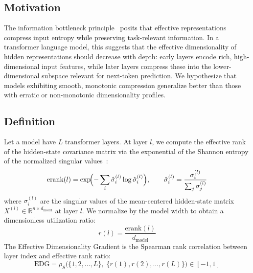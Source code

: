 \documentclass{article}
\begin{document}
\subsection{Motivation}
\label{sec:edg-motivation}

The information bottleneck principle~\citep{tishby2015deep,shwartz2017opening} posits that effective representations compress input entropy while preserving task-relevant information.
In a transformer language model, this suggests that the effective dimensionality of hidden representations should decrease with depth: early layers encode rich, high-dimensional input features, while later layers compress these into the lower-dimensional subspace relevant for next-token prediction.
We hypothesize that models exhibiting smooth, monotonic compression generalize better than those with erratic or non-monotonic dimensionality profiles.

\subsection{Definition}
\label{sec:edg-definition}

Let a model have $L$ transformer layers. At layer $l$, we compute the effective rank of the hidden-state covariance matrix via the exponential of the Shannon entropy of the normalized singular values~\citep{roy2007effective}:
\begin{equation}
  \text{erank}(l) = \exp\!\Bigl(-\sum_{i} \hat\sigma_i^{(l)} \log \hat\sigma_i^{(l)}\Bigr), \qquad \hat\sigma_i^{(l)} = \frac{\sigma_i^{(l)}}{\sum_j \sigma_j^{(l)}}
  \label{eq:erank}
\end{equation}
where $\sigma_i^{(l)}$ are the singular values of the mean-centered hidden-state matrix $X^{(l)} \in \mathbb{R}^{n \times d_{\text{model}}}$ at layer $l$.
We normalize by the model width to obtain a dimensionless utilization ratio:
\begin{equation}
  r(l) = \frac{\text{erank}(l)}{d_{\text{model}}}
  \label{eq:erank-ratio}
\end{equation}
The Effective Dimensionality Gradient is the Spearman rank correlation between layer index and effective rank ratio:
\begin{equation}
  \text{EDG} = \rho_S\!\bigl(\{1, 2, \ldots, L\},\; \{r(1), r(2), \ldots, r(L)\}\bigr) \in [-1, 1]
  \label{eq:edg}
\end{equation}
\end{document}
